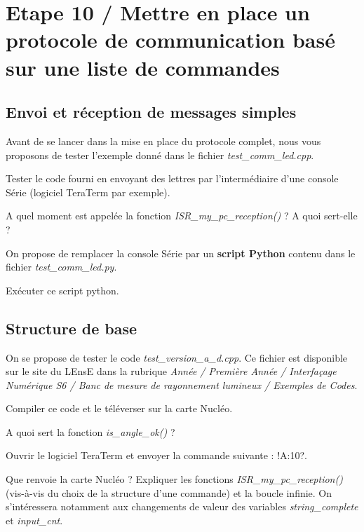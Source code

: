 \documentclass[a4paper,11pt,titlepage]{article} %
\begin{document}
\section{Etape 10 / Mettre en place un protocole de communication basé sur une liste de commandes}

\subsection{Envoi et réception de messages simples}

Avant de se lancer dans la mise en place du protocole complet, nous vous proposons de tester l'exemple donné dans le fichier \textsl{test\_comm\_led.cpp}.

\Manip Tester le code fourni en envoyant des lettres par l'intermédiaire d'une console Série (logiciel TeraTerm par exemple).

\Quest A quel moment est appelée la fonction \textsl{ISR\_my\_pc\_reception()} ? A quoi sert-elle ?

\bigskip

On propose de remplacer la console Série par un \textbf{script Python} contenu dans le fichier \textsl{test\_comm\_led.py}.

\Manip Exécuter ce script python.


\subsection{Structure de base}

On se propose de tester le code \textsl{test\_version\_a\_d.cpp}. Ce fichier est disponible sur le site du LEnsE dans la rubrique \textit{Année / Première Année / Interfaçage Numérique S6 / Banc de mesure de rayonnement lumineux / Exemples de Codes}.

\Manip Compiler ce code et le téléverser sur la carte Nucléo.

\Quest A quoi sert la fonction \textsl{is\_angle\_ok()} ?

\Manip Ouvrir le logiciel TeraTerm et envoyer la commande suivante : \textsc{!A:10?}.

\Quest Que renvoie la carte Nucléo ? Expliquer les fonctions \textsl{ISR\_my\_pc\_reception()} (vis-à-vis du choix de la structure d'une commande) et la boucle infinie. On s'intéressera notamment aux changements de valeur des variables \textsl{string\_complete} et \textsl{input\_cnt}.
\end{document}
